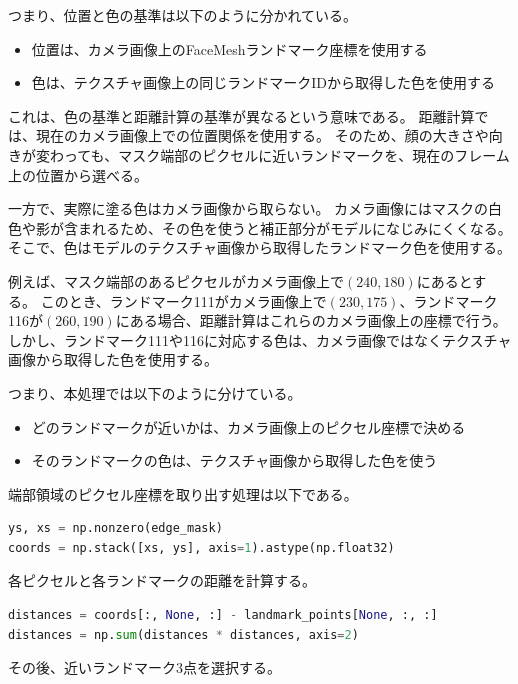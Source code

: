 \documentclass[uplatex,dvipdfmx]{jsarticle}
\begin{document}
つまり、位置と色の基準は以下のように分かれている。

\begin{itemize}
  \item 位置は、カメラ画像上のFaceMeshランドマーク座標を使用する
  \item 色は、テクスチャ画像上の同じランドマークIDから取得した色を使用する
\end{itemize}

これは、色の基準と距離計算の基準が異なるという意味である。
距離計算では、現在のカメラ画像上での位置関係を使用する。
そのため、顔の大きさや向きが変わっても、マスク端部のピクセルに近いランドマークを、現在のフレーム上の位置から選べる。

一方で、実際に塗る色はカメラ画像から取らない。
カメラ画像にはマスクの白色や影が含まれるため、その色を使うと補正部分がモデルになじみにくくなる。
そこで、色はモデルのテクスチャ画像から取得したランドマーク色を使用する。

例えば、マスク端部のあるピクセルがカメラ画像上で$(240, 180)$にあるとする。
このとき、ランドマーク111がカメラ画像上で$(230, 175)$、ランドマーク116が$(260, 190)$にある場合、距離計算はこれらのカメラ画像上の座標で行う。
しかし、ランドマーク111や116に対応する色は、カメラ画像ではなくテクスチャ画像から取得した色を使用する。

つまり、本処理では以下のように分けている。

\begin{itemize}
  \item どのランドマークが近いかは、カメラ画像上のピクセル座標で決める
  \item そのランドマークの色は、テクスチャ画像から取得した色を使う
\end{itemize}

端部領域のピクセル座標を取り出す処理は以下である。

\begin{lstlisting}[language=Python]
ys, xs = np.nonzero(edge_mask)
coords = np.stack([xs, ys], axis=1).astype(np.float32)
\end{lstlisting}

各ピクセルと各ランドマークの距離を計算する。

\begin{lstlisting}[language=Python]
distances = coords[:, None, :] - landmark_points[None, :, :]
distances = np.sum(distances * distances, axis=2)
\end{lstlisting}

その後、近いランドマーク3点を選択する。
\end{document}

